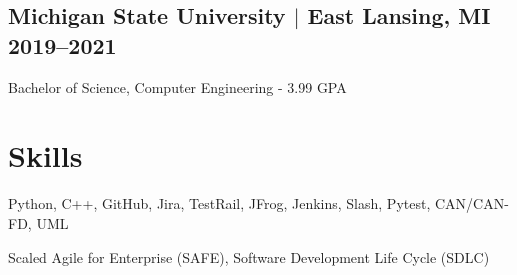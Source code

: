 \documentclass[11pt]{article} %
\begin{document}
\subsection{Michigan State University $|$ {\normalfont East Lansing, MI} \hfill 2019--2021}
\noindent Bachelor of Science, Computer Engineering - 3.99 GPA


\section{Skills}
\begin{description}[itemsep=0pt]
	\item[Technologies] Python, C++, GitHub, Jira, TestRail, JFrog, Jenkins, Slash, Pytest, CAN/CAN-FD, UML
	\item[Practices] Scaled Agile for Enterprise (SAFE), Software Development Life Cycle (SDLC)
\end{description}
\end{document}
